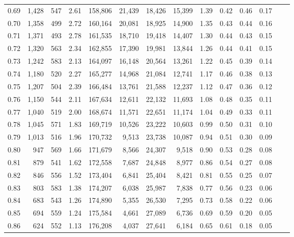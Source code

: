 \begin{tabular}{rrrrrrrrrrrrrr}
0.69 &  1,428 &  547 &    2.61 &  158,806 &   21,439 &  18,426 &  15,399 &  1.39 &  0.42 &  0.46 &      0.17 \\
0.70 &  1,358 &  499 &    2.72 &  160,164 &   20,081 &  18,925 &  14,900 &  1.35 &  0.43 &  0.44 &      0.16 \\
0.71 &  1,371 &  493 &    2.78 &  161,535 &   18,710 &  19,418 &  14,407 &  1.30 &  0.44 &  0.43 &      0.15 \\
0.72 &  1,320 &  563 &    2.34 &  162,855 &   17,390 &  19,981 &  13,844 &  1.26 &  0.44 &  0.41 &      0.15 \\
0.73 &  1,242 &  583 &    2.13 &  164,097 &   16,148 &  20,564 &  13,261 &  1.22 &  0.45 &  0.39 &      0.14 \\
0.74 &  1,180 &  520 &    2.27 &  165,277 &   14,968 &  21,084 &  12,741 &  1.17 &  0.46 &  0.38 &      0.13 \\
0.75 &  1,207 &  504 &    2.39 &  166,484 &   13,761 &  21,588 &  12,237 &  1.12 &  0.47 &  0.36 &      0.12 \\
0.76 &  1,150 &  544 &    2.11 &  167,634 &   12,611 &  22,132 &  11,693 &  1.08 &  0.48 &  0.35 &      0.11 \\
0.77 &  1,040 &  519 &    2.00 &  168,674 &   11,571 &  22,651 &  11,174 &  1.04 &  0.49 &  0.33 &      0.11 \\
0.78 &  1,045 &  571 &    1.83 &  169,719 &   10,526 &  23,222 &  10,603 &  0.99 &  0.50 &  0.31 &      0.10 \\
0.79 &  1,013 &  516 &    1.96 &  170,732 &    9,513 &  23,738 &  10,087 &  0.94 &  0.51 &  0.30 &      0.09 \\
0.80 &    947 &  569 &    1.66 &  171,679 &    8,566 &  24,307 &   9,518 &  0.90 &  0.53 &  0.28 &      0.08 \\
0.81 &    879 &  541 &    1.62 &  172,558 &    7,687 &  24,848 &   8,977 &  0.86 &  0.54 &  0.27 &      0.08 \\
0.82 &    846 &  556 &    1.52 &  173,404 &    6,841 &  25,404 &   8,421 &  0.81 &  0.55 &  0.25 &      0.07 \\
0.83 &    803 &  583 &    1.38 &  174,207 &    6,038 &  25,987 &   7,838 &  0.77 &  0.56 &  0.23 &      0.06 \\
0.84 &    683 &  543 &    1.26 &  174,890 &    5,355 &  26,530 &   7,295 &  0.73 &  0.58 &  0.22 &      0.06 \\
0.85 &    694 &  559 &    1.24 &  175,584 &    4,661 &  27,089 &   6,736 &  0.69 &  0.59 &  0.20 &      0.05 \\
0.86 &    624 &  552 &    1.13 &  176,208 &    4,037 &  27,641 &   6,184 &  0.65 &  0.61 &  0.18 &      0.05 \\

\end{tabular}
